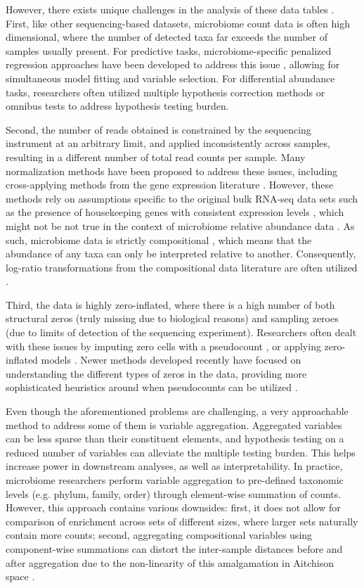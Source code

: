 \documentclass[10pt,letterpaper]{article}
\begin{document}
However, there exists unique challenges in the analysis of these data tables \cite{li2019,li2015}. First, like other sequencing-based datasets, microbiome count data is often high dimensional, where the number of detected taxa far exceeds the number of samples usually present. For predictive tasks, microbiome-specific penalized regression approaches have been developed to address this issue \cite{shi2016}, allowing for simultaneous model fitting and variable selection. For differential abundance tasks, researchers often utilized multiple hypothesis correction methods \cite{sankaran2014,benjamini1995} or omnibus tests \cite{chen2018} to address hypothesis testing burden. 

Second, the number of reads obtained is constrained by the sequencing instrument at an arbitrary limit, and applied inconsistently across samples, resulting in a different number of total read counts per sample. Many normalization methods \cite{weiss2017} have been proposed to address these issues, including cross-applying methods from the gene expression literature \cite{mcmurdie2014}. However, these methods rely on assumptions specific to the original bulk RNA-seq data sets such as the presence of housekeeping genes with consistent expression levels \cite{love2014}, which might not be not true in the context of microbiome relative abundance data \cite{quinn2019,quinn2018b}. As such, microbiome data is strictly compositional \cite{gloor2017}, which means that the abundance of any taxa can only be interpreted relative to another. Consequently, log-ratio transformations from the compositional data literature are often utilized \cite{aitchison1999}. 

Third, the data is highly zero-inflated, where there is a high number of both structural zeros (truly missing due to biological reasons) and sampling zeroes (due to limits of detection of the sequencing experiment). Researchers often dealt with these issues by imputing zero cells with a pseudocount \cite{kurtz2015}, or applying zero-inflated models \cite{chen2018, kaul2017}. Newer methods developed recently have focused on understanding the different types of zeros in the data, providing more sophisticated heuristics around when pseudocounts can be utilized \cite{kaul2017a}.   

Even though the aforementioned problems are challenging, a very approachable method to address some of them is variable aggregation. Aggregated variables can be less sparse than their constituent elements, and hypothesis testing on a reduced number of variables can alleviate the multiple testing burden. This helps increase power in downstream analyses, as well as interpretability. In practice, microbiome researchers perform variable aggregation to pre-defined taxonomic levels (e.g. phylum, family, order) through element-wise summation of counts. However, this approach contains various downsides: first, it does not allow for comparison of enrichment across sets of different sizes, where larger sets naturally contain more counts; second, aggregating compositional variables using component-wise summations can distort the inter-sample distances before and after aggregation due to the non-linearity of this amalgamation in Aitchison space \cite{egozcue2005}. 
\end{document}
